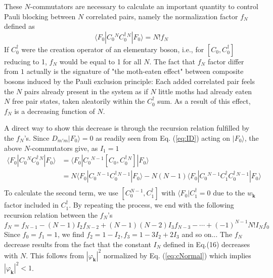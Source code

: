 \documentclass[aps,prb,preprint,groupedaddress,amsmath]{revtex4}
\newcommand{\vk}{\ensuremath{\mathbf{k}}}
\newcommand{\dg}{\ensuremath{\dagger}}
\begin{document}
These $N$-commutators are necessary to calculate an important quantity to control Pauli blocking between $N$ correlated pairs, namely the normalization factor $f_N$ defined as
\begin{equation}\label{eq:cn}
\langle{}F_0|{C_0^{ }}{}^N{C_0^\dg}{}^N|F_0{\rangle}=N!f_N
\end{equation}
If $C^\dg_0$ were the creation operator of an elementary boson, i.e., for $[C_0,C^\dg_0]$ reducing to 1,  $f_N$ would be equal to 1 for all $N$.  The fact that $f_N$ factor differ from $1$ actually is the signature of "the moth-eaten effect" between composite bosons induced by the Pauli exclusion principle: Each added correlated pair feels the $N$ pairs already present in the system as if $N$ little moths had already eaten $N$ free pair states, taken aleatorily within the $C^\dg_{0}$ sum.  As a result of this effect, $f_N$ is a decreasing function of $N$. 

A direct way to show this decrease is through  the recursion relation fulfilled by the $f_N$'s.  Since $D_{m'm}|F_0\rangle=0 $  as readily seen from Eq. (\ref{eq:ID}) acting on $|F_0\rangle$, the above $N$-commutators give,  as $I_1=1$ 
\begin{equation}
\begin{split} 
\langle{}F_0|{C_0^{ }}{}^N{C_0^\dg}{}^N|F_0{\rangle}&
	=\langle{}F_0|{C_0^{ }}{}^{N-1}[C_0,{C_0^\dg}{}^N]|F_0{\rangle}\\
	&=N\langle{}F_0|{C_0^{ }}{}^{N-1}{C_0^\dg}{}^{N-1}|F_0{\rangle}
	-N(N-1)\langle{}F_0|{C_0^{ }}{}^{N-1}C_1^\dg{C_0^\dg}{}^{N-1}|F_0{\rangle}\\
\end{split}
\end{equation}
To calculate the second term, we  use $[C_0^{N-1},C_1^\dg]$ with $\langle{}F_0|C^\dg_1=0$ due to the $w_\vk$ factor included in $C^\dg_1$. By repeating the process, we end with the following recursion relation between the $f_N$'s 
\begin{equation}\label{eq:fn}
f_N=f_{N-1}-(N-1)I_2f_{N-2}+(N-1)(N-2)I_3f_{N-3}-\cdots+(-1)^{N-1}N!I_Nf_0
\end{equation}
Since $f_0=f_1=1$, we find $f_2=1-I_2,f_3=1-3I_2+2I_3$ and so on... The $f_N$ decrease results from the fact that  the constant $I_N$ defined in Eq.(16) decreases with $N$. This follows from  $|\varphi_\vk|^2$ normalized by  Eq. (\ref{eq:cNormal}) which implies $|\varphi_\vk|^2<1$.
\end{document}
